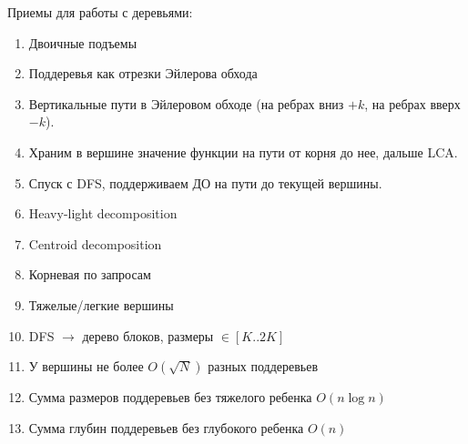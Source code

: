 Приемы для работы с деревьями:
\begin{enumerate}
  \setlength\itemsep{0em}
  \item Двоичные подъемы
  \item Поддеревья как отрезки Эйлерова обхода
  \item Вертикальные пути в Эйлеровом обходе (на ребрах вниз $+k$, на ребрах вверх $-k$).
  \item Храним в вершине значение функции на пути от корня до нее, дальше LCA.
  \item Спуск с DFS, поддерживаем ДО на пути до текущей вершины.
  \item Heavy-light decomposition
  \item Centroid decomposition
  \item Корневая по запросам
  \item Тяжелые/легкие вершины
  \item DFS $\rightarrow$ дерево блоков, размеры $\in [K..2K]$
  \item У вершины не более $O(\sqrt{N})$ разных поддеревьев 
  \item Сумма размеров поддеревьев без тяжелого ребенка $O(n\log{n})$
  \item Сумма глубин поддеревьев без глубокого ребенка $O(n)$
\end{enumerate}
